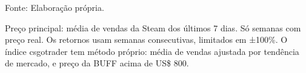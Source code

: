 \begin{table}[H]
\caption{Preço Steam contra Outras Fontes — CS:GO}\label{tab:sources} 

\fontsize{12.0pt}{14.4pt}\selectfont

\par\vspace{\belowcaptionskip}\footnotesize Fonte: Elaboração própria.\par
\begin{minipage}{\linewidth}
Preço principal: média de vendas da Steam dos últimos 7 dias. Só semanas com preço real. Os retornos usam semanas consecutivas, limitados em ±100\%. O índice csgotrader tem método próprio: média de vendas ajustada por tendência de mercado, e preço da BUFF acima de US\$ 800.\\
\end{minipage}
\end{table}
